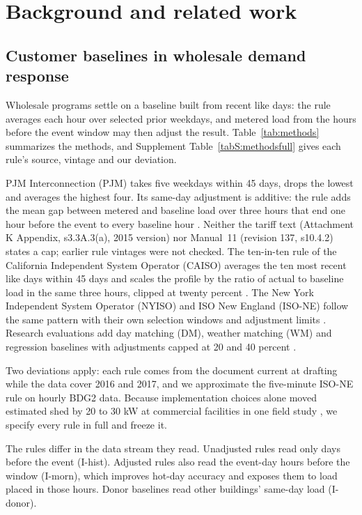 \section{Background and related work}\label{sec:background}

\subsection{Customer baselines in wholesale demand response}\label{sec:background:rules}

Wholesale programs settle on a baseline built from recent like days: the rule averages each hour over selected prior weekdays, and metered load from the hours before the event window may then adjust the result. Table~\ref{tab:methods} summarizes the methods, and Supplement Table~\ref{tabS:methodsfull} gives each rule's source, vintage and our deviation.

PJM Interconnection (PJM) takes five weekdays within 45 days, drops the lowest and averages the highest four. Its same-day adjustment is additive: the rule adds the mean gap between metered and baseline load over three hours that end one hour before the event to every baseline hour \citep{pjm_manual11,pjm_attk}. Neither the tariff text (Attachment K Appendix, s3.3A.3(a), 2015 version) nor Manual~11 (revision 137, s10.4.2) states a cap; earlier rule vintages were not checked. The ten-in-ten rule of the California Independent System Operator (CAISO) averages the ten most recent like days within 45 days and scales the profile by the ratio of actual to baseline load in the same three hours, clipped at twenty percent \citep{caiso_tariff}. The New York Independent System Operator (NYISO) and ISO New England (ISO-NE) follow the same pattern with their own selection windows and adjustment limits \citep{nyiso_manual7,isone_mr1}. Research evaluations add day matching (DM), weather matching (WM) and regression baselines with adjustments capped at 20 and 40 percent \citep{granderson2021,mathieu2011}.

Two deviations apply: each rule comes from the document current at drafting while the data cover 2016 and 2017, and we approximate the five-minute ISO-NE rule on hourly BDG2 data. Because implementation choices alone moved estimated shed by 20 to 30 kW at commercial facilities in one field study \citep{addy2015}, we specify every rule in full and freeze it.

The rules differ in the data stream they read. Unadjusted rules read only days before the event (I-hist). Adjusted rules also read the event-day hours before the window (I-morn), which improves hot-day accuracy and exposes them to load placed in those hours. Donor baselines read other buildings' same-day load (I-donor).

